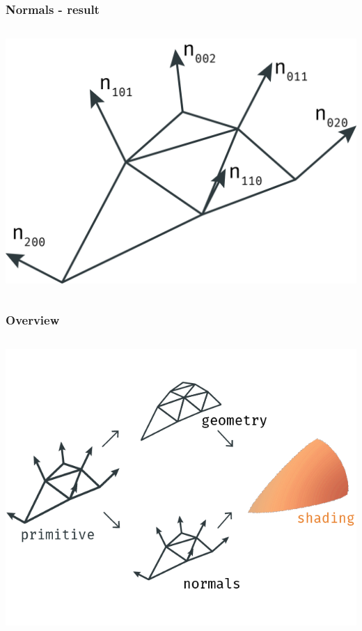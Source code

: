 	\begin{frame}
		\frametitle{Normals - result}
		\begin{columns}
			\begin{column}{0.6\textwidth}
				\begin{center}
					\includegraphics[width=\textwidth]{img/1_single/normals.png}
				\end{center}	
			\end{column}
		\end{columns}
	\end{frame}


	\begin{frame}\frametitle{Overview}
		\begin{columns}
			\begin{column}{0.9\textwidth}
				\begin{center}
					\includegraphics[width=\textwidth]{./img/1_single/recap_result.png}
				\end{center}		
			\end{column}
		\end{columns}
	\end{frame}	


